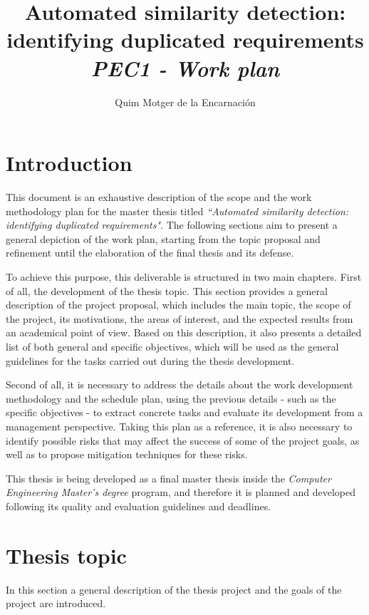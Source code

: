 \documentclass[11pt]{article}
\title{Automated similarity detection:\\ identifying duplicated requirements\\\textit{PEC1 - Work plan}}
\author{
%
Quim Motger de la Encarnación
\institution{Universitat Oberta de Catalunya\\Universitat Politecnica de Catalunya}
}
\begin{document}
\maketitle

\section{Introduction}
\label{sec:introduction}

This document is an exhaustive description of the scope and the work methodology plan for the master thesis titled \textit{``Automated similarity detection: identifying duplicated requirements"}. The following sections aim to present a general depiction of the work plan, starting from the topic proposal and refinement until the elaboration of the final thesis and its defense.

To achieve this purpose, this deliverable is structured in two main chapters. First of all, the development of the thesis topic. This section provides a general description of the project proposal, which includes the main topic, the scope of the project, its motivations, the areas of interest, and the expected results from an academical point of view. Based on this description, it also presents a detailed list of both general and specific objectives, which will be used as the general guidelines for the tasks carried out during the thesis development.

Second of all, it is necessary to address the details about the work development methodology and the schedule plan, using the previous details - such as the specific objectives - to extract concrete tasks and evaluate its development from a management perspective. Taking this plan as a reference, it is also necessary to identify possible risks that may affect the success of some of the project goals, as well as to propose mitigation techniques for these risks.

This thesis is being developed as a final master thesis inside the \textit{Computer Engineering Master's degree} program, and therefore it is planned and developed following its quality and evaluation guidelines and deadlines.

\section{Thesis topic}
\label{sec:topic_description}

In this section a general description of the thesis project and the goals of the project are introduced.
\end{document}
